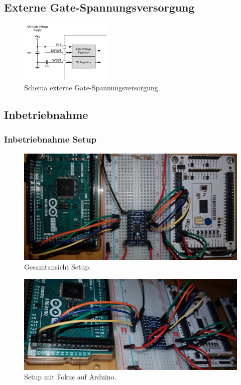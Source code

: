 \subsection{Externe Gate-Spannungsversorgung}\label{Appendix:Gate_Spannungsversorgung}

\begin{figure}[H]
	\centering
	\includegraphics[width=0.4\textwidth]{graphics/Schema_Gate_Treiber_Gatespannung}
	\caption{Schema externe Gate-Spannungsversorgung.\cite[S.11]{trinamicmotion_control_gmbh__co_kg_tmc6200_2019}}
	\label{fig:Schema_Gate_Treiber_Gatespannung}
\end{figure}

\subsection{Inbetriebnahme}

\subsubsection{Inbetriebnahme Setup}\label{Appendix:TMC6200_Setup}

\begin{figure}[H]
	\centering
	\includegraphics[angle=270,width=\textwidth]{graphics/1_komplett}
	\caption{Gesamtansicht Setup.}
	\label{fig:1_komplett}
\end{figure}

\begin{figure}[H]
	\centering
	\includegraphics[width=\textwidth]{graphics/1_Arduino}
	\caption{Setup mit Fokus auf Arduino.}
	\label{fig:1_Arduino}
\end{figure}

